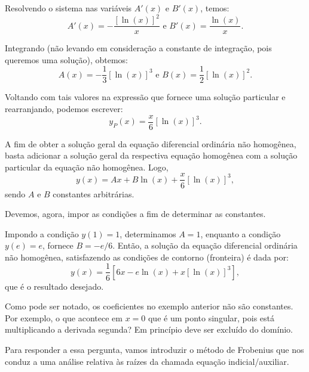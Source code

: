 {Resolvendo o sistema nas variáveis $A'(x)$ e $B'(x)$, temos:
$$A'(x) = -\dfrac{[\ln(x)]^2}{x} \mbox{ e } B'(x) = \dfrac{\ln(x)}{x}.$$

Integrando (não levando em consideração a constante de integração, pois queremos uma solução), obtemos:
$$A(x) = -\dfrac{1}{3}[\ln(x)]^3 \mbox{ e } B(x) = \dfrac{1}{2}[\ln(x)]^2.$$

Voltando com tais valores na expressão que fornece uma solução particular e rearranjando, podemos escrever:
$$y_P (x) = \dfrac{x}{6}[\ln(x)]^3.$$

A fim de obter a solução geral da equação diferencial ordinária não homogênea, basta adicionar a solução geral da respectiva equação homogênea com a solução particular da equação não homogênea. Logo,
$$y(x) = Ax + B \ln(x) + \dfrac{x}{6} [\ln(x)]^3,$$
sendo $A$ e $B$ constantes arbitrárias.

Devemos, agora, impor as condições a fim de determinar as constantes.

Impondo a condição $y(1) = 1$, determinamos $A = 1$, enquanto a condição $y(e) = e$, fornece $B = -e/6$. Então, a solução da equação diferencial ordinária não homogênea, satisfazendo as condições de contorno (fronteira) é dada por:
$$y(x) = \dfrac{1}{6} [6x - e \ln(x) + x [\ln(x)]^3],$$
que é o resultado desejado.
}

\indent

\indent

Como pode ser notado, os coeficientes no exemplo anterior não são constantes. Por exemplo, o que acontece em $x = 0$ que é um ponto singular, pois está multiplicando a derivada segunda? Em princípio deve ser excluído do domínio.

Para responder a essa pergunta, vamos introduzir o método de Frobenius que nos conduz a uma análise relativa às raízes da chamada equação indicial/auxiliar.


